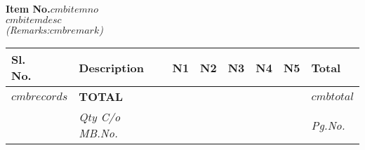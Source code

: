 
\noindent\textbf{Item No.$cmbitemno$}\\
\noindent $cmbitemdesc$\\
\noindent\emph{(Remarks:$cmbremark$)}\\
\vspace*{-\baselineskip}
\begin{longtabu} to \textwidth {|X[1,c]|X[10,l]|X[3,r]|X[3,r]|X[3,r]|X[3,r]|X[3,r]|X[5,r]|}
   \hline
    \textbf{Sl.\newline No.} & \textbf{Description} & \textbf{N1} & \textbf{N2} & \textbf{N3} & \textbf{N4} & \textbf{N5} & \textbf{Total} \\
   \hline
    \endhead
$cmbrecords$
    \hline
      & \textbf{TOTAL} & &  &  &  &  & \textbf{$cmbtotal$} \\
   \hline
      & \emph{Qty C/o MB.No. } &  &  &  &  &  & \emph{Pg.No. \pageref{$cmbcarriedover$}} \label{$cmblabel$} \\
   \hline
\end{longtabu}

